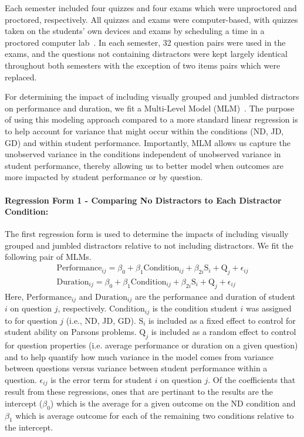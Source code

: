 \documentclass[authorversion,nonacm]{acmart}
\begin{document}
Each semester included four quizzes and four exams which were unproctored and
proctored, respectively. All quizzes and exams were computer-based, with
quizzes taken on the students' own devices and exams by scheduling a time in a
proctored computer lab~\cite{zilles2019every}. In each semester, 32 question
pairs were used in the exams, and the questions not containing distractors were
kept largely identical throughout both semesters with the exception of two
items pairs which were replaced. 

For determining the impact of including visually grouped and jumbled
distractors on performance and duration, we fit a Multi-Level Model
(MLM)~\cite{snijders2011multilevel}. The purpose of using this modeling
approach compared to a more standard linear regression is to help account for
variance that might occur within the conditions (ND, JD, GD) and within student
performance. Importantly, MLM allows us capture the unobserved variance in the
conditions independent of unobserved variance in student performance, thereby
allowing us to better model when outcomes are more impacted by student
performance or by question.


\noindent \paragraph{Regression Form 1 - Comparing No Distractors to Each Distractor Condition:}
The first regression form is used to determine the impacts of including visually grouped  
and jumbled distractors relative to not including distractors. We fit the
following pair of MLMs.
\begin{align*}
  \text{Performance}_{ij} = \beta_0 +  \beta_1\text{Condition}_{ij} + \beta_{2i}\text{S}_{i} + \text{Q}_{j} + \epsilon_{ij}\\
  \text{Duration}_{ij} = \beta_0 + \beta_1\text{Condition}_{ij} + \beta_{2i}\text{S}_{i} + \text{Q}_{j} + \epsilon_{ij} 
\end{align*}
Here, $\text{Performance}_{ij}$ and $\text{Duration}_{ij}$ are the performance
and duration of student $i$ on question $j$, respectively.
$\text{Condition}_{ij}$ is the condition student $i$ was assigned to for
question $j$ (i.e., ND, JD, GD). $\text{S}_{i}$ is included as a fixed effect
to control for student ability on Parsons problems. $\text{Q}_{j}$ is included
as a random effect to control for question properties (i.e. average performance
or duration on a given question) and to help quantify how much variance in the
model comes from variance between questions versus variance between student
performance within a question.  $\epsilon_{ij}$ is the error term for student
$i$ on question $j$.  Of the coefficients that result from these regressions,
ones that are pertinant to the results are the intercept ($\beta_0$) which is
the average for a given outcome on the ND condition and $\beta_1$ which is
average outcome for each of the remaining two conditions relative to the
intercept. 
\end{document}
